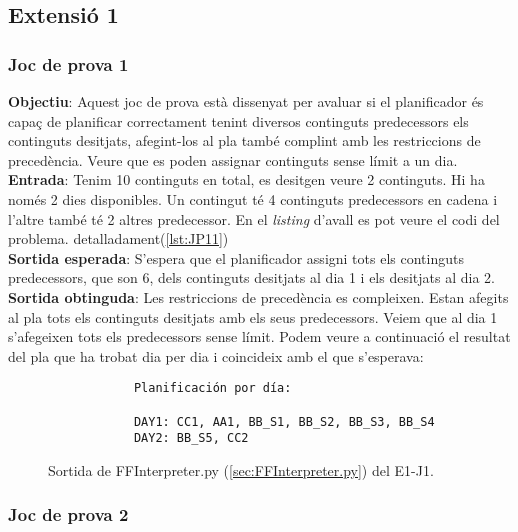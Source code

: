 \documentclass[a4paper]{article}
\begin{document}
	
	\subsection{Extensió 1}
	
	
	\subsubsection*{Joc de prova 1}
	
	\noindent \textbf{Objectiu}: Aquest joc de prova està dissenyat per avaluar si el planificador és capaç de planificar correctament tenint diversos continguts predecessors els continguts desitjats, afegint-los al pla també complint amb les restriccions de precedència. Veure que es poden assignar continguts sense límit a un dia. \\
	
	\noindent \textbf{Entrada}: Tenim 10 continguts en total, es desitgen veure 2 continguts. Hi ha només 2 dies disponibles. Un contingut té 4 continguts predecessors en cadena i l'altre també té 2 altres predecessor. En el \textit{listing} d'avall es pot veure el codi del problema.  detalladament(\ref{lst:JP11}) \\
	
	\noindent \textbf{Sortida esperada}: S'espera que el planificador assigni tots els continguts predecessors, que son 6, dels continguts desitjats al dia 1 i els desitjats al dia 2. \\
	
	\noindent \textbf{Sortida obtinguda}: Les restriccions de precedència es compleixen. Estan afegits al pla tots els continguts desitjats amb els seus predecessors. Veiem que al dia 1 s'afegeixen tots els predecessors sense límit. Podem veure a continuació el resultat del pla que ha trobat dia per dia i coincideix amb el que s'esperava:
	
	\begin{figure}[H]
		\centering
		\begin{verbatim}
			Planificación por día:
			
			DAY1: CC1, AA1, BB_S1, BB_S2, BB_S3, BB_S4
			DAY2: BB_S5, CC2	
		\end{verbatim}
		\caption{Sortida de FFInterpreter.py (\ref{sec:FFInterpreter.py}) del E1-J1.}
	\end{figure}	
	
	\subsubsection*{Joc de prova 2}
	
\end{document}
